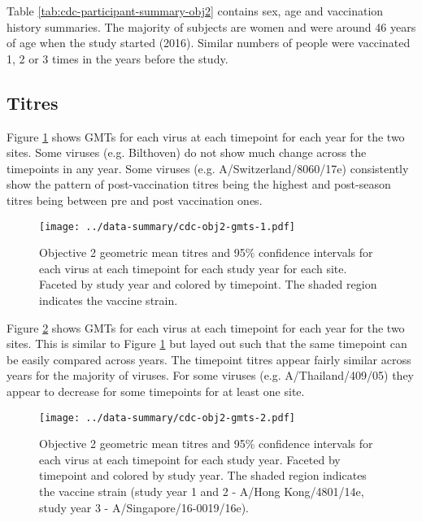 \documentclass[12pt]{article}
\begin{document}
Table \ref{tab:cdc-participant-summary-obj2} contains sex, age and
vaccination history summaries.
The majority of subjects are
women and were around 46 years of age when the study started (2016).
Similar numbers of people were vaccinated 1, 2 or 3 times in the years before
the study.



\subsection{Titres}

Figure \ref{fig:cdc-obj2-gmts-1} shows GMTs for each virus at each timepoint for each year for the two sites.
Some viruses (e.g. Bilthoven) do not show much change across the timepoints in
any year. Some viruses (e.g. A/Switzerland/8060/17e) consistently show the pattern of post-vaccination titres being the highest and post-season titres being between pre and post vaccination ones.

\begin{figure}
	\texttt{[image: ../data-summary/cdc-obj2-gmts-1.pdf]}
	\caption{Objective 2 geometric mean titres and 95\% confidence intervals for each virus at each timepoint for each study year for each site. Faceted by study year and colored by timepoint. The shaded region indicates the vaccine strain.}
	\label{fig:cdc-obj2-gmts-1}
\end{figure}

Figure \ref{fig:cdc-obj2-gmts-2} shows GMTs for each virus at each timepoint for each year for the two sites. This is similar to Figure \ref{fig:cdc-obj2-gmts-1} but layed out such that the same timepoint can be easily compared across years. The timepoint titres appear fairly similar across years for the majority of viruses. For some viruses (e.g. A/Thailand/409/05) they appear to decrease for some timepoints for at least one site.

\begin{figure}
	\texttt{[image: ../data-summary/cdc-obj2-gmts-2.pdf]}
	\caption{Objective 2 geometric mean titres and 95\% confidence intervals for each virus at each timepoint for each study year. Faceted by timepoint and colored by study year. The shaded region indicates the vaccine strain (study year 1 and 2 - A/Hong Kong/4801/14e, study year 3 - A/Singapore/16-0019/16e).}
	\label{fig:cdc-obj2-gmts-2}
\end{figure}
\end{document}
